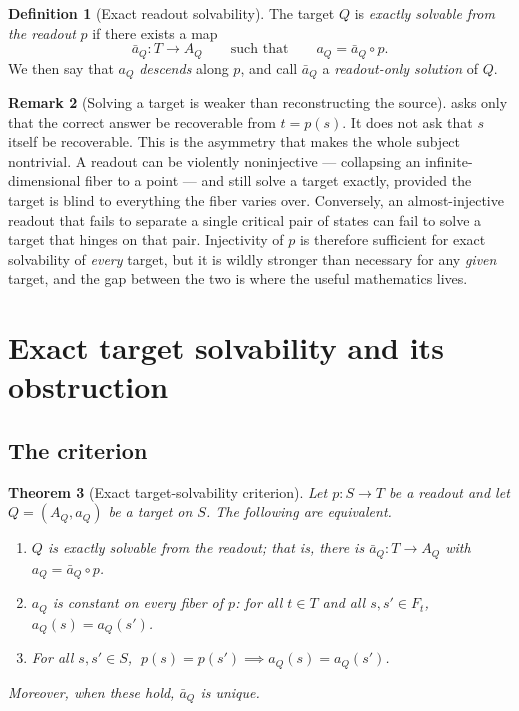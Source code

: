 \documentclass[11pt,reqno]{amsart}
\theoremstyle{plain}
\newtheorem{theorem}{Theorem}[section]
\theoremstyle{definition}
\newtheorem{definition}[theorem]{Definition}
\newtheorem{remark}[theorem]{Remark}
\newcommand{\Src}{S}
\newcommand{\Rdt}{T}
\begin{document}
\begin{definition}[Exact readout solvability]\label{def:solvable}
The target $Q$ is \emph{exactly solvable from the readout} $p$ if there exists a map
\begin{equation}\label{eq:solvable}
\bar a_Q\colon\Rdt\longrightarrow A_Q
\qquad\text{such that}\qquad
a_Q=\bar a_Q\circ p .
\end{equation}
We then say that $a_Q$ \emph{descends} along $p$, and call $\bar a_Q$ a \emph{readout-only
solution} of $Q$.
\end{definition}

\begin{remark}[Solving a target is weaker than reconstructing the source]\label{rem:weaker}
 asks only that the correct answer be recoverable from $t=p(s)$. It does not
ask that $s$ itself be recoverable. This is the asymmetry that makes the whole subject
nontrivial. A readout can be violently noninjective --- collapsing an infinite-dimensional fiber
to a point --- and still solve a target exactly, provided the target is blind to everything the
fiber varies over. Conversely, an almost-injective readout that fails to separate a single
critical pair of states can fail to solve a target that hinges on that pair. Injectivity of $p$
is therefore sufficient for exact solvability of \emph{every} target, but it is wildly stronger
than necessary for any \emph{given} target, and the gap between the two is where the useful
mathematics lives.
\end{remark}

\section{Exact target solvability and its obstruction}\label{sec:exact}

\subsection{The criterion}

\begin{theorem}[Exact target-solvability criterion]\label{thm:exact-solvability}
Let $p\colon\Src\to\Rdt$ be a readout and let $Q=(A_Q,a_Q)$ be a target on $\Src$. The following
are equivalent.
\begin{enumerate}
\item\label{it:solv} $Q$ is exactly solvable from the readout; that is, there is
$\bar a_Q\colon\Rdt\to A_Q$ with $a_Q=\bar a_Q\circ p$.
\item\label{it:fibconst} $a_Q$ is constant on every fiber of $p$: for all $t\in\Rdt$ and all
$s,s'\in F_t$, $a_Q(s)=a_Q(s')$.
\item\label{it:imp} For all $s,s'\in\Src$, $\;p(s)=p(s') \implies a_Q(s)=a_Q(s')$.
\end{enumerate}
Moreover, when these hold, $\bar a_Q$ is unique.
\end{theorem}
\end{document}
